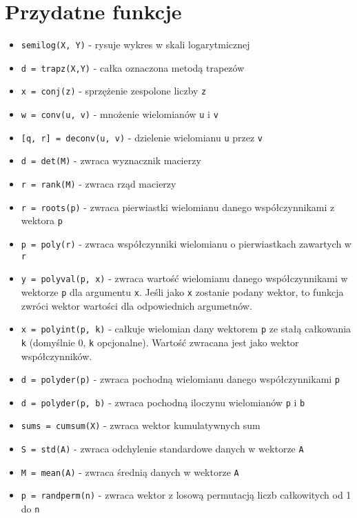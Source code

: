 \section*{Przydatne funkcje}

\begin{itemize}
    \item \texttt{semilog(X, Y)} - rysuje wykres w skali logarytmicznej
    \item \texttt{d = trapz(X,Y)} - całka oznaczona metodą trapezów
    \item \texttt{x = conj(z)} - sprzężenie zespolone liczby \texttt{z}
    \item \texttt{w = conv(u, v)} - mnożenie wielomianów \texttt{u} i \texttt{v}
    \item \texttt{[q, r] = deconv(u, v)} - dzielenie wielomianu \texttt{u} przez \texttt{v}
    \item \texttt{d = det(M)} - zwraca wyznacznik macierzy
    \item \texttt{r = rank(M)} - zwraca rząd macierzy
    \item \texttt{r = roots(p)} - zwraca pierwiastki wielomianu danego współczynnikami z wektora \texttt{p}
    \item \texttt{p = poly(r)} - zwraca współczynniki wielomianu o pierwiastkach zawartych w \texttt{r}
    \item \texttt{y = polyval(p, x)} - zwraca wartość wielomianu danego współczynnikami w wektorze \texttt{p} dla argumentu \texttt{x}.
    Jeśli jako \texttt{x} zostanie podany wektor, to funkcja zwróci wektor wartości dla odpowiednich argumetnów.
    \item \texttt{x = polyint(p, k)} - całkuje wielomian dany wektorem \texttt{p} ze stałą całkowania \texttt{k} (domyślnie $0$, \texttt{k} opcjonalne).
    Wartość zwracana jest jako wektor współczynników.
    \item \texttt{d = polyder(p)} - zwraca pochodną wielomianu danego współczynnikami \texttt{p}
    \item \texttt{d = polyder(p, b)} - zwraca pochodną iloczynu wielomianów \texttt{p} i \texttt{b}
    \item \texttt{sums = cumsum(X)} - zwraca wektor kumulatywnych sum 
    \item \texttt{S = std(A)} - zwraca odchylenie standardowe danych w wektorze \texttt{A}
    \item \texttt{M = mean(A)} - zwraca średnią danych w wektorze \texttt{A}
    \item \texttt{p = randperm(n)} - zwraca wektor z losową permutacją liczb całkowitych od 1 do \texttt{n}
\end{itemize}
